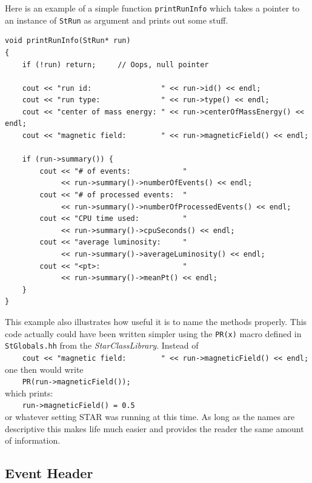 \documentclass[twoside]{article}
\newcommand{\name}[1]{\textsl{#1}}%
\begin{document}
  Here is
an example of a simple function \texttt{printRunInfo} which takes a
pointer to an instance of \texttt{StRun} as argument and prints out
some stuff.
\begin{verbatim}
void printRunInfo(StRun* run)
{
    if (!run) return;     // Oops, null pointer

    cout << "run id:                " << run->id() << endl;
    cout << "run type:              " << run->type() << endl;
    cout << "center of mass energy: " << run->centerOfMassEnergy() << endl;
    cout << "magnetic field:        " << run->magneticField() << endl;

    if (run->summary()) {
        cout << "# of events:            "
             << run->summary()->numberOfEvents() << endl;
        cout << "# of processed events:  "
             << run->summary()->numberOfProcessedEvents() << endl;
        cout << "CPU time used:          "
             << run->summary()->cpuSeconds() << endl;
        cout << "average luminosity:     "
             << run->summary()->averageLuminosity() << endl;
        cout << "<pt>:                   "
             << run->summary()->meanPt() << endl;
    }
}
\end{verbatim}
This example also illustrates how useful it is to name the methods
properly. This code actually could have been written simpler using the
\texttt{PR(x)} macro defined in \texttt{StGlobals.hh} from the
\name{StarClassLibrary}.
Instead of\\
\verb+    cout << "magnetic field:        " << run->magneticField() << endl;+\\
one then would write\\
\verb+    PR(run->magneticField());+\\
which prints:\\
\verb+    run->magneticField() = 0.5+\\
or whatever setting STAR was running at this time. As long as the
names are descriptive this makes life much easier and provides the
reader the same amount of information.

\subsection{Event Header}
  
\end{document}
